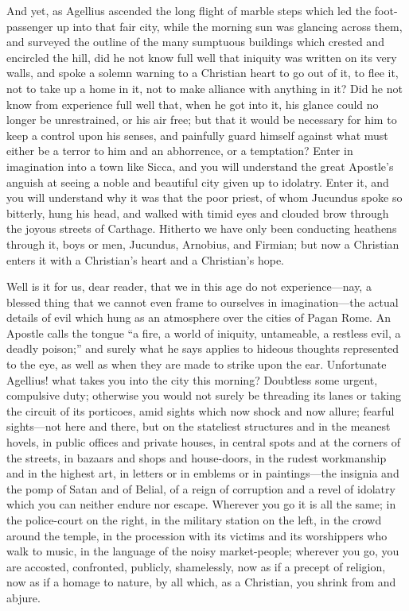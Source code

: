 And yet, as Agellius ascended the long flight of marble steps which
led the foot-passenger up into that fair city, while the morning sun
was glancing across them, and surveyed the outline of the many
sumptuous buildings which crested and encircled the hill, did he not
know full well that iniquity was written on its very walls, and spoke
a solemn warning to a Christian heart to go out of it, to flee it, not
to take up a home in it, not to make alliance with anything in it? Did
he not know from experience full well that, when he got into it, his
glance could no longer be unrestrained, or his air free; but that it
would be necessary for him to keep a control upon his senses, and
painfully guard himself against what must either be a terror to him
and an abhorrence, or a temptation? Enter in imagination into a town
like Sicca, and you will understand the great Apostle's anguish at
seeing a noble and beautiful city given up to idolatry. Enter it, and
you will understand why it was that the poor priest, of whom Jucundus
spoke so bitterly, hung his head, and walked with timid eyes and
clouded brow through the joyous streets of Carthage. Hitherto we have
only been conducting heathens through it, boys or men, Jucundus,
Arnobius, and Firmian; but now a Christian enters it with a Christian's
heart and a Christian's hope.

Well is it for us, dear reader, that we in this age do not
experience—nay, a blessed thing that we cannot even frame to
ourselves in imagination—the actual details of evil which hung as an
atmosphere over the cities of Pagan Rome. An Apostle calls the
tongue ``a fire, a world of iniquity, untameable, a restless evil,
a deadly poison;'' and surely what he says applies to hideous
thoughts represented to the eye, as well as when they are made to
strike upon the ear. Unfortunate Agellius! what takes you into the
city this morning? Doubtless some urgent, compulsive duty; otherwise
you would not surely be threading its lanes or taking the circuit of
its porticoes, amid sights which now shock and now allure; fearful
sights—not here and there, but on the stateliest structures and in
the meanest hovels, in public offices and private houses, in central
spots and at the corners of the streets, in bazaars and shops and
house-doors, in the rudest workmanship and in the highest art, in
letters or in emblems or in paintings—the insignia and the pomp of
Satan and of Belial, of a reign of corruption and a revel of idolatry
which you can neither endure nor escape. Wherever you go it is all the
same; in the police-court on the right, in the military station on the
left, in the crowd around the temple, in the procession with its
victims and its worshippers who walk to music, in the language of the
noisy market-people; wherever you go, you are accosted, confronted,
publicly, shamelessly, now as if a precept of religion, now as if a
homage to nature, by all which, as a Christian, you shrink from and
abjure.


